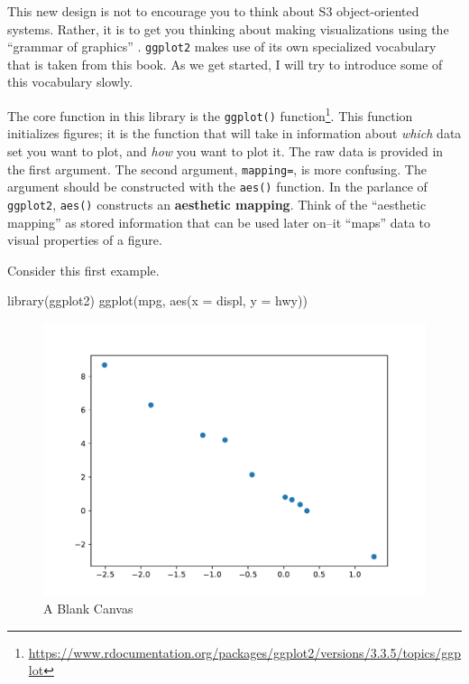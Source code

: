 \documentclass[
  12pt,
  krantz2]{krantz}
\makeatletter
\newenvironment{Shaded}{\begin{snugshade}}{\end{snugshade}}
\newcommand{\AttributeTok}[1]{\textcolor[rgb]{0.61,0.61,0.61}{#1}}
\newcommand{\FunctionTok}[1]{\textcolor[rgb]{0,0,0}{#1}}
\newcommand{\NormalTok}[1]{#1}
\renewcommand{\href}[2]{#2\footnote{\url{#1}}}
\newenvironment{kframe}{%
\medskip{}
\setlength{\fboxsep}{.8em}
 \def\at@end@of@kframe{}%
 \ifinner\ifhmode%
  \def\at@end@of@kframe{\end{minipage}}%
  \begin{minipage}{\columnwidth}%
 \fi\fi%
 \def\FrameCommand##1{\hskip\@totalleftmargin \hskip-\fboxsep
 \colorbox{shadecolor}{##1}\hskip-\fboxsep
     \hskip-\linewidth \hskip-\@totalleftmargin \hskip\columnwidth}%
 \MakeFramed {\advance\hsize-\width
   \@totalleftmargin\z@ \linewidth\hsize
   \@setminipage}}%
 {\par\unskip\endMakeFramed%
 \at@end@of@kframe}
\renewenvironment{Shaded}{\begin{kframe}}{\end{kframe}}
\makeatother
\begin{document}
This new design is not to encourage you to think about S3 object-oriented systems. Rather, it is to get you thinking about making visualizations using the ``grammar of graphics'' \citep{gog}. \texttt{ggplot2} makes use of its own specialized vocabulary that is taken from this book. As we get started, I will try to introduce some of this vocabulary slowly.

The core function in this library is the \href{https://www.rdocumentation.org/packages/ggplot2/versions/3.3.5/topics/ggplot}{\texttt{ggplot()} function}. This function initializes figures; it is the function that will take in information about \emph{which} data set you want to plot, and \emph{how} you want to plot it. The raw data is provided in the first argument. The second argument, \texttt{mapping=}, is more confusing. The argument should be constructed with the \texttt{aes()} function. In the parlance of \texttt{ggplot2}, \texttt{aes()} constructs an \textbf{aesthetic mapping}. Think of the ``aesthetic mapping'' as stored information that can be used later on--it ``maps'' data to visual properties of a figure.

Consider this first example.

\begin{Shaded}
\begin{Highlighting}[]
\FunctionTok{library}\NormalTok{(ggplot2)}
\FunctionTok{ggplot}\NormalTok{(mpg, }\FunctionTok{aes}\NormalTok{(}\AttributeTok{x =}\NormalTok{ displ, }\AttributeTok{y =}\NormalTok{ hwy))}
\end{Highlighting}
\end{Shaded}

\begin{figure}
\includegraphics[width=0.8\linewidth]{r_and_python_book_files/figure-latex/unnamed-chunk-221-1} \caption{A Blank Canvas}\label{fig:unnamed-chunk-221}
\end{figure}
\end{document}
